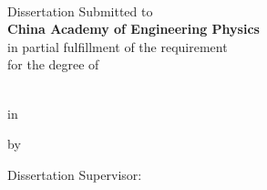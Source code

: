 \vspace{7pt}

\begin{center}
  \noindent
  \bfseries
  \thethesistimecn
\end{center}

\cleardoublepage

\begin{center}
  \bfseries
  \fontsize{20pt}{20pt} \selectfont
  \hspace*{\fill}\\
  \theentitle
\end{center}

\vspace{20pt}

\begin{center}
  Dissertation Submitted to\\
  \textbf{China Academy of Engineering Physics}\\
  in partial fulfillment of the requirement\\
  for the degree of\\
  \textbf{\thedgreelevelen}\\
\end{center}

\vspace{20pt}

\begin{center}
  in
  \\
  \textbf{\thefielden}
\end{center}
\vspace{20pt}
\begin{center}
  by\\
  \textbf{\theenauthor}
\end{center}

\vspace{50pt}

\begin{center}
  Dissertation Supervisor: \printsupervisoren \printsecondsupervisoren
\end{center}

\vspace{20pt}

\begin{center}
  \textbf{\thethesismonthen}
\end{center}

